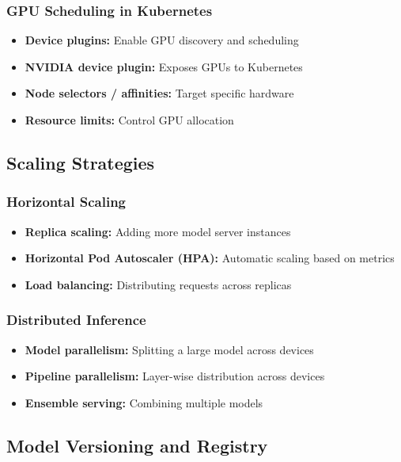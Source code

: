 \documentclass[11pt]{article}
\begin{document}
\subsubsection{GPU Scheduling in Kubernetes}
\begin{itemize}
    \item \textbf{Device plugins:} Enable GPU discovery and scheduling
    \item \textbf{NVIDIA device plugin:} Exposes GPUs to Kubernetes
    \item \textbf{Node selectors / affinities:} Target specific hardware
    \item \textbf{Resource limits:} Control GPU allocation
\end{itemize}

\subsection{Scaling Strategies}

\subsubsection{Horizontal Scaling}
\begin{itemize}
    \item \textbf{Replica scaling:} Adding more model server instances
    \item \textbf{Horizontal Pod Autoscaler (HPA):} Automatic scaling based on metrics
    \item \textbf{Load balancing:} Distributing requests across replicas
\end{itemize}

\subsubsection{Distributed Inference}
\begin{itemize}
    \item \textbf{Model parallelism:} Splitting a large model across devices
    \item \textbf{Pipeline parallelism:} Layer-wise distribution across devices
    \item \textbf{Ensemble serving:} Combining multiple models
\end{itemize}

\subsection{Model Versioning and Registry}
\end{document}

